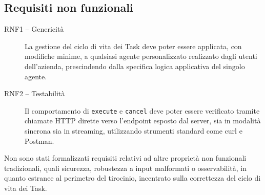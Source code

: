 \subsection{Requisiti non funzionali}

\begin{description}
    \item[RNF1 -- Genericità] La gestione del ciclo di vita dei Task deve poter essere applicata, con modifiche minime, a qualsiasi agente personalizzato realizzato dagli utenti dell'azienda, prescindendo dalla specifica logica applicativa del singolo agente.
    \item[RNF2 -- Testabilità] Il comportamento di \texttt{execute} e \texttt{cancel} deve poter essere verificato tramite chiamate HTTP dirette verso l'endpoint esposto dal server, sia in modalità sincrona sia in streaming, utilizzando strumenti standard come curl e Postman.
\end{description}

Non sono stati formalizzati requisiti relativi ad altre proprietà non funzionali tradizionali, quali sicurezza, robustezza a input malformati o osservabilità, in quanto estranee al perimetro del tirocinio, incentrato sulla correttezza del ciclo di vita dei Task.